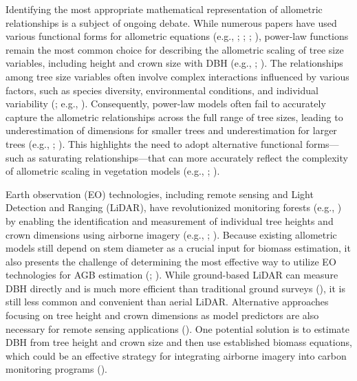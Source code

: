 \documentclass[
  12pt,
  letterpaper,
  DIV=11,
  numbers=noendperiod]{scrartcl}
\begin{document}
Identifying the most appropriate mathematical representation of
allometric relationships is a subject of ongoing debate. While numerous
papers have used various functional forms for allometric equations
(e.g., ;
;
;
), power-law functions remain
the most common choice for describing the allometric scaling of tree
size variables, including height and crown size with DBH (e.g.,
;
). The relationships among
tree size variables often involve complex interactions influenced by
various factors, such as species diversity, environmental conditions,
and individual variability (; e.g., ).
Consequently, power-law models often fail to accurately capture the
allometric relationships across the full range of tree sizes, leading to
underestimation of dimensions for smaller trees and underestimation for
larger trees (e.g., ;
). This highlights the need to
adopt alternative functional forms---such as saturating
relationships---that can more accurately reflect the complexity of
allometric scaling in vegetation models (e.g.,
;
).

Earth observation (EO) technologies, including remote sensing and Light
Detection and Ranging (LiDAR), have revolutionized monitoring forests
(e.g., ) by enabling the
identification and measurement of individual tree heights and crown
dimensions using airborne imagery (e.g.,
;
). Because existing
allometric models still depend on stem diameter as a crucial input for
biomass estimation, it also presents the challenge of determining the
most effective way to utilize EO technologies for AGB estimation
(;
). While ground-based LiDAR
can measure DBH directly and is much more efficient than traditional
ground surveys (), it is
still less common and convenient than aerial LiDAR. Alternative
approaches focusing on tree height and crown dimensions as model
predictors are also necessary for remote sensing applications
(). One potential solution
is to estimate DBH from tree height and crown size and then use
established biomass equations, which could be an effective strategy for
integrating airborne imagery into carbon monitoring programs
().
\end{document}

